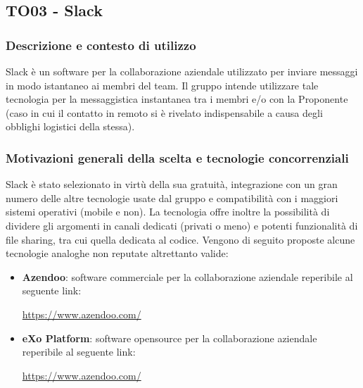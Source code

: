 \documentclass[./../Technology Baseline.tex]{subfiles}
\begin{document}
\subsection{TO03 - Slack}

\subsubsection{Descrizione e contesto di utilizzo}
Slack è un software per la collaborazione aziendale utilizzato per inviare messaggi in modo istantaneo ai membri del team. Il gruppo intende utilizzare tale tecnologia per la messaggistica instantanea tra i membri e/o con la Proponente (caso in cui il contatto in remoto si è rivelato indispensabile a causa degli obblighi logistici della stessa).

\subsubsection{Motivazioni generali della scelta e tecnologie concorrenziali}
Slack è stato selezionato in virtù della sua gratuità, integrazione con un gran numero delle altre tecnologie usate dal gruppo e compatibilità con i maggiori sistemi operativi (mobile e non). La tecnologia offre inoltre la possibilità di dividere gli argomenti in canali dedicati (privati o meno) e potenti funzionalità di file sharing, tra cui quella dedicata al codice. Vengono di seguito proposte alcune tecnologie analoghe non reputate altrettanto valide:
\begin{itemize}
	\item \textbf{Azendoo}: software commerciale per la collaborazione aziendale reperibile al seguente link:
	\begin{center}
		\url{https://www.azendoo.com/}
	\end{center}
	\item \textbf{eXo Platform}: software opensource per la collaborazione aziendale reperibile al seguente link:
	\begin{center}
	\url{https://www.azendoo.com/}
	\end{center}
\end{itemize}
\end{document}
